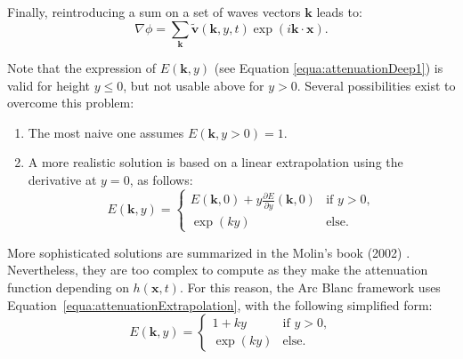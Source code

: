 \documentclass[11pt]{article}
\def\framework{the Arc Blanc framework\xspace}
\begin{document}
Finally, reintroducing a sum on a set of waves vectors $\mathbf{k}$ leads to:
\begin{equation}
	\nabla \phi =
	\sum_{\mathbf{k}}\tilde{\mathbf{v}}(\mathbf{k}, y, t)\exp\left(i\mathbf{k}\cdot\mathbf{x}\right).
\end{equation}

Note that the expression of $E\left(\mathbf{k},y\right)$ (see Equation \ref{equa:attenuationDeep1}) is valid for height $y\leq0$, but not usable above for $y>0$.
Several possibilities exist to overcome this problem:
\begin{enumerate}
	\item The most naive one assumes $E(\mathbf k,y>0)=1$.
	\item A more realistic solution is based on a linear extrapolation using the derivative at $y=0$, as follows:
	      \begin{equation}
		      \label{equa:attenuationExtrapolation}
		      E(\mathbf{k}, y)=
		      \begin{cases}
			      E(\mathbf k,0)+y\frac{\partial E}{\partial y}(\mathbf k,0) & \text{if~}y>0, \\
			      \exp(ky)                                                   & \text{else.}
		      \end{cases}
	      \end{equation}
\end{enumerate}

More sophisticated solutions are summarized in the Molin's book (2002) \cite{molinHydrodynamiqueStructuresOffshore2002}.
Nevertheless, they are too complex to compute as they make the attenuation function depending on $h(\mathbf x,t)$.
For this reason, \framework uses Equation~\ref{equa:attenuationExtrapolation}, with the following simplified form:
\begin{equation}
	\label{equa:attenuationFull}
	E(\mathbf{k}, y)=
	\begin{cases}
		1+ky     & \text{if~}y>0, \\
		\exp(ky) & \text{else.}
	\end{cases}
\end{equation}



\end{document}
